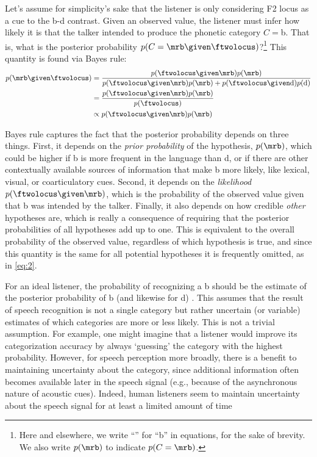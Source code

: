 Let's assume for simplicity's sake that the listener is only considering F2 locus as a cue to the \ph b-\ph d contrast.  Given an observed \ftwolocus value, the listener must infer how likely it is that the talker intended to produce the phonetic category $C=$\ph b.  That is, what is the posterior probability $p(C=\mrb \given \ftwolocus)$?\footnote{Here and elsewhere, we write ``\mrb'' for ``\ph b'' in equations, for the sake of brevity.  We also write $p(\mrb)$ to indicate $p(C=\mrb)$.}  This quantity is found via Bayes rule:
\begin{align}
  \label{eq:1}
  p(\mrb \given \ftwolocus) &= \frac{p(\ftwolocus \given \mrb) p(\mrb)}{p(\ftwolocus \given \mrb) p(\mrb) + p(\ftwolocus \given \mathrm d) p(\mathrm d)} \\
  &=\frac{p(\ftwolocus \given \mrb) p(\mrb)}{p(\ftwolocus)} \\
  \label{eq:2}
  &\propto p(\ftwolocus \given \mrb) p(\mrb)
\end{align}

Bayes rule captures the fact that the posterior probability depends on three things.  First, it depends on the \emph{prior probability} of the hypothesis, $p(\mrb)$, which could be higher if \ph b is more frequent in the language than \ph d, or if there are other contextually available sources of information that make \ph b more likely, like lexical, visual, or coarticulatory cues.  Second, it depends on the \emph{likelihood} $p(\ftwolocus \given \mrb)$, which is the probability of the observed \ftwolocus value given that \ph b was intended by the talker.  Finally, it also depends on how credible \emph{other} hypotheses are, which is really a consequence of requiring that the posterior probabilities of all hypotheses add up to one.  This is equivalent to the overall probability of the observed \ftwolocus value, regardless of which hypothesis is true, and since this quantity is the same for all potential hypotheses it is frequently omitted, as in \eqref{eq:2}.

For an ideal listener, the probability of recognizing a \ph b should be the estimate of the posterior probability of \ph b (and likewise for \ph d) \autocite{Clayards2008,Feldman2009a}.  This assumes that the result of speech recognition is not a single category but rather uncertain (or variable) estimates of which categories are more or less likely.  This is not a trivial assumption. For example, one might imagine that a listener would improve its categorization accuracy by always `guessing' the category with the highest probability.  However, for speech perception more broadly, there is a benefit to maintaining uncertainty about the category, since additional information often becomes available later in the speech signal (e.g., because of the asynchronous nature of acoustic cues). Indeed, human listeners seem to maintain uncertainty about the speech signal for at least a limited amount of time \autocite[cf., right-context effects in word recognition,][]{Bard1988,Connine1991,Dahan2010,Grosjean1985}

